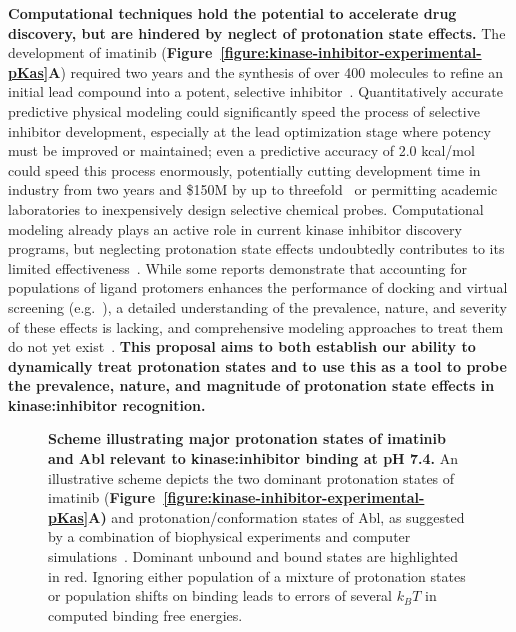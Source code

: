 \documentclass[11pt]{article}
\begin{document}
{\bf Computational techniques hold the potential to accelerate drug discovery, but are hindered by neglect of protonation state effects.}
The development of imatinib ({\bf Figure~\ref{figure:kinase-inhibitor-experimental-pKas}A}) required two years and the synthesis of over 400 molecules to refine an initial lead compound into a potent, selective inhibitor~\cite{the-story-of-gleevec}.
Quantitatively accurate predictive physical modeling could significantly speed the process of selective inhibitor development, especially at the lead optimization stage where potency must be improved or maintained; even a predictive accuracy of 2.0 kcal/mol could speed this process enormously, potentially cutting development time in industry from two years and \$150M by up to threefold~\cite{shirts-mobley-brown:2009:sbdd,paul:2010:nrdd:pharma-research-development} or permitting academic laboratories to inexpensively design selective chemical probes.
Computational modeling already plays an active role in current kinase inhibitor discovery programs, but neglecting protonation state effects undoubtedly contributes to its limited effectiveness~\cite{schneider:2010:nrdd:virtual-screening}.
While some reports demonstrate that accounting for populations of ligand protomers enhances the performance of docking and virtual screening (e.g.~\cite{exner:jcamd:2010:protonation-states-docking}), a detailed understanding of the prevalence, nature, and severity of these effects is lacking, and comprehensive modeling approaches to treat them do not yet exist~\cite{onufriev:quart-rev-biophys:2013:protonation-state-effects}.
{\bf This proposal aims to both establish our ability to dynamically treat protonation states and to use this as a tool to probe the prevalence, nature, and magnitude of protonation state effects in kinase:inhibitor recognition.}

\begin{figure}[tb]
\caption{\footnotesize {\bf Scheme illustrating major protonation states of imatinib and Abl relevant to kinase:inhibitor binding at pH 7.4.}
An illustrative scheme depicts the two dominant protonation states of imatinib ({\bf Figure~\ref{figure:kinase-inhibitor-experimental-pKas}A) } and protonation/conformation states of Abl, as suggested by a combination of biophysical experiments and computer simulations~\cite{szakacks:j-med-chem:2005:acid-base-profiling-of-imatinib,seeliger:2007:structure:imatinib-binding,roux:pnas:2013:gleevec-selectivity}.
Dominant unbound and bound states are highlighted in red.
Ignoring either population of a mixture of protonation states or population shifts on binding leads to errors of several $k_B T$ in computed binding free energies.
\vspace{-0.2in}
\label{figure:imatinib-binding-scheme}}
\end{figure}
\end{document}
